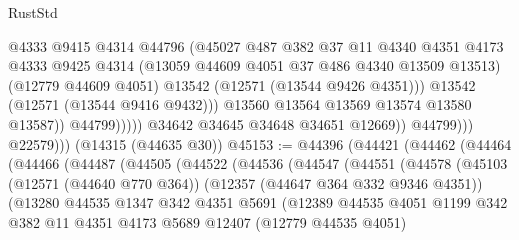 \begin{lexlean}{RustStd}
\begin{coremodule}
                                    @4333
                                    @9415
                                    @4314
                                    @44796
                                    (@45027
                                      @487
                                      @382
                                      @37
                                      @11
                                      @4340
                                      @4351
                                      @4173
                                      @4333
                                      @9425
                                      @4314
                                      (@13059 @44609 @4051 @37 @486 @4340 @13509 @13513)
                                      (@12779 @44609 @4051)
                                      @13542
                                      (@12571 (@13544 @9426 @4351)))
                                    @13542
                                    (@12571 (@13544 @9416 @9432)))
                                  @13560
                                  @13564
                                  @13569
                                  @13574
                                  @13580
                                  @13587))
                              @44799)))))
                    @34642
                    @34645
                    @34648
                    @34651
                    @12669))
                @44799)))
          @22579)))
    (@14315 (@44635 @30))
@45153 := @44396
    (@44421
      (@44462
        (@44464
          (@44466
            (@44487
              (@44505
                (@44522
                  (@44536
                    (@44547
                      (@44551
                        (@44578
                          (@45103
                            (@12571 (@44640 @770 @364))
                            (@12357 (@44647 @364 @332 @9346 @4351))
                            (@13280
                              @44535
                              @1347
                              @342
                              @4351
                              @5691
                              (@12389
                                @44535
                                @4051
                                @1199
                                @342
                                @382
                                @11
                                @4351
                                @4173
                                @5689
                                @12407
                                (@12779 @44535 @4051)

\end{coremodule}
\end{lexlean}
